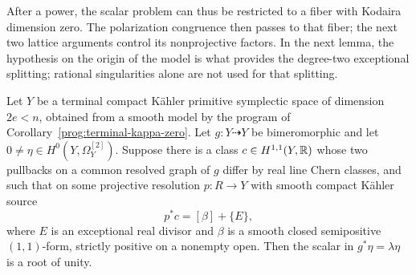 After a power, the scalar problem can thus be restricted to a fiber with
Kodaira dimension zero.  The polarization congruence then passes to that
fiber; the next two lattice arguments control its nonprojective factors.
In the next lemma, the hypothesis
on the origin of the model is what provides the degree-two exceptional
splitting; rational singularities alone are not used for that splitting.

\begin{lemma}\label{floor:symplectic-scalar}
Let \(Y\) be a terminal compact K\"ahler primitive symplectic space of
dimension \(2e<n\), obtained from a smooth model by the program of
Corollary~\ref{prog:terminal-kappa-zero}.  Let \(g:Y\dashrightarrow Y\) be
bimeromorphic and let \(0\ne\eta\in H^0(Y,\Omega_Y^{[2]})\).  Suppose
there is a class \(c\in H^{1,1}(Y,\mathbb R)\) whose two pullbacks on a common
resolved graph of \(g\) differ by real line Chern classes, and such that
on some projective resolution \(p:R\to Y\) with smooth compact K\"ahler source
\[
 p^*c=[\beta]+\{E\},
\]
where \(E\) is an exceptional real divisor and \(\beta\) is a smooth
closed semipositive \((1,1)\)-form, strictly positive on a nonempty open.
Then the scalar in \(g^*\eta=\lambda\eta\) is a root of unity.
\end{lemma}

